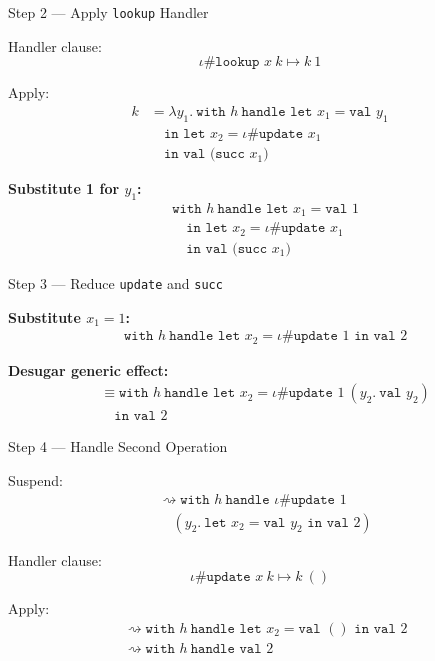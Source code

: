 \begin{frame}{Step 2 — Apply \texttt{lookup} Handler}

Handler clause:
\[
\iota \# \texttt{lookup } x\ k \mapsto k\ 1
\]

Apply:
\begin{align*}
k &= \lambda y_1.\ \texttt{with } h\ \texttt{handle let } x_1 = \texttt{val } y_1 \\
  &\quad \texttt{in let } x_2 = \iota \# \texttt{update } x_1 \\
  &\quad \texttt{in val (succ } x_1)
\end{align*}

\textbf{Substitute 1 for \( y_1 \):}
\begin{align*}
&\texttt{with } h\ \texttt{handle let } x_1 = \texttt{val } 1 \\
&\quad \texttt{in let } x_2 = \iota \# \texttt{update } x_1 \\
&\quad \texttt{in val (succ } x_1)
\end{align*}
\end{frame}


\begin{frame}{Step 3 — Reduce \texttt{update} and \texttt{succ}}

\textbf{Substitute \( x_1 = 1 \):}
\begin{align*}
&\texttt{with } h\ \texttt{handle let } x_2 = \iota \# \texttt{update } 1 \texttt{ in val } 2
\end{align*}

\textbf{Desugar generic effect:}
\begin{align*}
&\equiv \texttt{with } h\ \texttt{handle let } x_2 = \iota \# \texttt{update } 1\ (y_2.\ \texttt{val } y_2) \\
&\quad \texttt{in val } 2
\end{align*}
\end{frame}

 \begin{frame}{Step 4 — Handle Second Operation}

Suspend:
\begin{align*}
&\rightsquigarrow \texttt{with } h\ \texttt{handle } \iota \# \texttt{update } 1 \\
&\quad \left(y_2.\ \texttt{let } x_2 = \texttt{val } y_2 \texttt{ in val } 2\right)
\end{align*}

Handler clause:
\[
\iota \# \texttt{update } x\ k \mapsto k\ ()
\]

Apply:
\begin{align*}
&\rightsquigarrow \texttt{with } h\ \texttt{handle let } x_2 = \texttt{val } () \texttt{ in val } 2 \\
&\rightsquigarrow \texttt{with } h\ \texttt{handle val } 2
\end{align*}
\end{frame}

